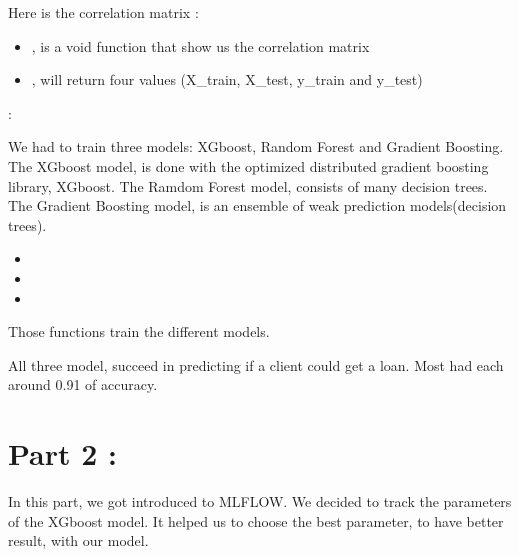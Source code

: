 \documentclass[letterpaper,10pt,english]{sphinxmanual}
\begin{document}
Here is the correlation matrix :

\begin{figure}[htbp]
\centering

\noindent{}
\end{figure}
\begin{itemize}
\item {} 
, is a void function that show us the correlation matrix

\item {} 
, will return four values (X\_train, X\_test, y\_train and y\_test)

\end{itemize}

 :

We had to train three models: XGboost, Random Forest and Gradient Boosting.
The XGboost model, is done with the optimized distributed gradient boosting library, XGboost.
The Ramdom Forest model, consists of many decision trees.
The Gradient Boosting model, is an ensemble of weak prediction models(decision trees).
\begin{itemize}
\item {} 

\item {} 

\item {} 

\end{itemize}

Those functions train the different models.

All three model, succeed in predicting if a client could get a loan. Most had each around 0.91 of accuracy.

\begin{figure}[htbp]
\centering

\noindent{}
\end{figure}


\chapter{Part 2 :}
\label{\detokenize{index:part-2}}
In this part, we got introduced to MLFLOW. We decided to track the parameters of the XGboost model.
It helped us to choose the best parameter, to have better result, with our model.
\end{document}
